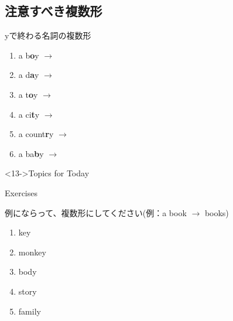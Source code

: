 \documentclass[aspectratio=169,xcolor={dvipsnames,table}]{beamer}
\begin{document}
\subsection{注意すべき複数形}
\begin{frame}[plain]{yで終わる名詞の複数形}\Large
\begin{enumerate}
 \item<1-> a b\textbf<14->{\textcolor<14->{YellowOrange}{o}}y $\rightarrow$ 
 \item<3-> a d\textbf<14->{\textcolor<14->{YellowOrange}{a}}y $\rightarrow$ 
 \item<5-> a t\textbf<14->{\textcolor<14->{YellowOrange}{o}}y $\rightarrow$ 
 \item<7-> a ci\textbf<14->{\textcolor<14->{CarnationPink}{t}}y $\rightarrow$ 
 \item<9-> a count\textbf<14->{\textcolor<14->{CarnationPink}{r}}y $\rightarrow$ 
 \item<11-> a ba\textbf<14->{\textcolor<14->{CarnationPink}{b}}y $\rightarrow$ 
\end{enumerate} 

\normalsize
\begin{exampleblock}<13->{Topics for Today}
\\
\hfill{}
\end{exampleblock}

\end{frame}
\begin{frame}[plain]{Exercises}

例にならって、複数形にしてください(例：a book $\longrightarrow$ books)

 \Large

\begin{enumerate}
 \item<1-> key 
 \item<1-> monkey 
 \item<1-> body 
 \item<1-> story 
 \item<1-> family 
\end{enumerate}
\end{frame}
\end{document}
